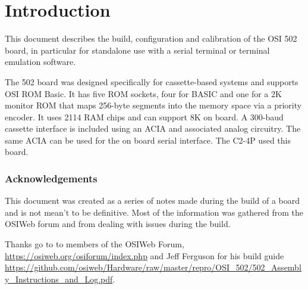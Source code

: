 \chapter{Introduction}

This document describes the build, configuration and calibration of the OSI 502 board, in particular for standalone use with a serial terminal or terminal emulation software.

The 502 board was designed specifically for cassette-based systems and supports OSI ROM Basic. It has five ROM sockets, four for BASIC and one for a 2K monitor ROM that maps 256-byte segments into the memory space via a priority encoder. It uses 2114 RAM chips and can support 8K on board. A 300-baud cassette interface is included using an ACIA and associated analog circuitry. The same ACIA can be used for the on board serial interface. The C2-4P used this board. 

\subsection*{Acknowledgements}

This document was created as a series of notes made during the build of a board and is not mean't to be definitive. Most of the information was gathered from the OSIWeb forum and from dealing with issues during the build.

Thanks go to to members of the OSIWeb Forum, \url{https://osiweb.org/osiforum/index.php} and Jeff Ferguson for his build guide \url{https://github.com/osiweb/Hardware/raw/master/repro/OSI_502/502_Assembly_Instructions_and_Log.pdf}.

